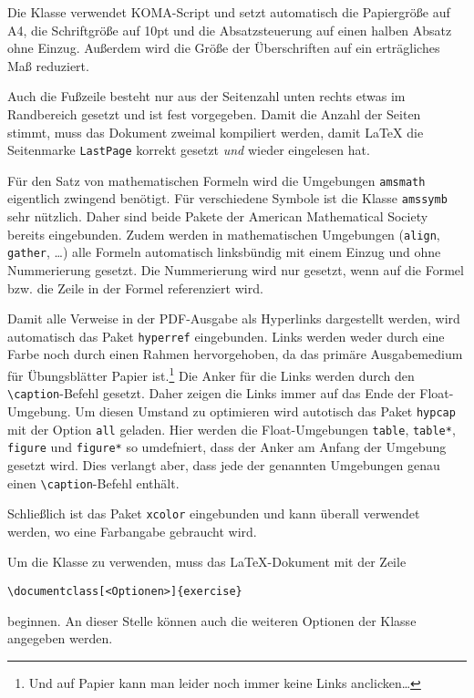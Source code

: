 \documentclass{exercise}
\begin{document}
    Die Klasse verwendet KOMA-Script \cite{koma} und setzt automatisch die
    Papiergröße auf A4, die Schriftgröße auf 10pt und die Absatzsteuerung auf
    einen halben Absatz ohne Einzug. Außerdem wird die Größe der Überschriften
    auf ein erträgliches Maß reduziert.

    Auch die Fußzeile besteht nur aus der Seitenzahl unten rechts etwas im
    Randbereich gesetzt und ist fest vorgegeben. Damit die Anzahl der Seiten
    stimmt, muss das Dokument zweimal kompiliert werden, damit \LaTeX{} die
    Seitenmarke \texttt{LastPage} korrekt gesetzt \emph{und} wieder eingelesen hat.

    Für den Satz von mathematischen Formeln wird die Umgebungen \texttt{amsmath}
    \cite{amsmath} eigentlich zwingend benötigt. Für verschiedene Symbole ist
    die Klasse \texttt{amssymb} sehr nützlich. Daher sind beide Pakete der
    American Mathematical Society bereits eingebunden. Zudem werden in
    mathematischen Umgebungen (\texttt{align}, \texttt{gather}, \ldots) alle
    Formeln automatisch linksbündig mit einem Einzug und ohne Nummerierung
    gesetzt. Die Nummerierung wird nur gesetzt, wenn auf die Formel bzw. die
    Zeile in der Formel referenziert wird.

    Damit alle Verweise in der PDF-Ausgabe als Hyperlinks dargestellt werden,
    wird automatisch das Paket \texttt{hyperref} \cite{hyperref} eingebunden.
    Links werden weder durch eine Farbe noch durch einen Rahmen hervorgehoben,
    da das primäre Ausgabemedium für Übungsblätter Papier ist.\footnote{Und
    auf Papier kann man leider noch immer keine Links anclicken\ldots} Die
    Anker für die Links werden durch den \lstinline{\caption}-Befehl gesetzt. Daher
    zeigen die Links immer auf das Ende der Float-Umgebung. Um diesen Umstand
    zu optimieren wird autotisch das Paket \texttt{hypcap} \cite{hypcap} mit der
    Option \texttt{all} geladen. Hier werden die Float-Umgebungen \lstinline{table},
    \lstinline{table*}, \lstinline{figure} und \lstinline{figure*} so umdefniert, dass
    der Anker am Anfang der Umgebung gesetzt wird. Dies verlangt aber, dass jede
    der genannten Umgebungen genau einen \lstinline{\caption}-Befehl enthält.

    Schließlich ist das Paket \texttt{xcolor} \cite{xcolor} eingebunden und kann
    überall verwendet werden, wo eine Farbangabe gebraucht wird.

    Um die Klasse zu verwenden, muss das \LaTeX{}-Dokument mit der Zeile
    \begin{lstlisting}[gobble=6]
      \documentclass[<Optionen>]{exercise}
    \end{lstlisting}
    beginnen. An dieser Stelle können auch die weiteren Optionen der Klasse
    angegeben werden.
\end{document}
